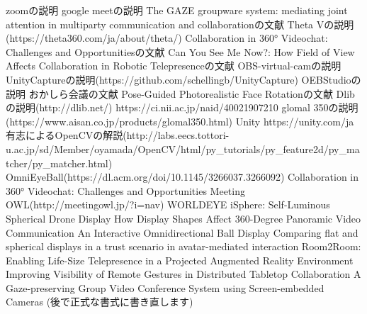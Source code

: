 
zoomの説明
google meetの説明
The GAZE groupware system: mediating joint attention in multiparty communication and collaborationの文献
Theta Vの説明(https://theta360.com/ja/about/theta/)
Collaboration in 360° Videochat: Challenges and Opportunitiesの文献
Can You See Me Now?: How Field of View Affects Collaboration in Robotic Telepresenceの文献
OBS-virtual-camの説明
UnityCaptureの説明(https://github.com/schellingb/UnityCapture)
OEBStudioの説明
おかしら会議の文献
Pose-Guided Photorealistic Face Rotationの文献
Dlibの説明(http://dlib.net/)
https://ci.nii.ac.jp/naid/40021907210
glomal 350の説明(https://www.aisan.co.jp/products/glomal350.html)
Unity https://unity.com/ja
有志によるOpenCVの解説(http://labs.eecs.tottori-u.ac.jp/sd/Member/oyamada/OpenCV/html/py\_tutorials/py\_feature2d/py\_matcher/py\_matcher.html)
OmniEyeBall(https://dl.acm.org/doi/10.1145/3266037.3266092)
Collaboration in 360° Videochat: Challenges and Opportunities
Meeting OWL(http://meetingowl.jp/?i=nav)
WORLDEYE
iSphere: Self-Luminous Spherical Drone Display
How Display Shapes Affect 360-Degree Panoramic Video Communication
An Interactive Omnidirectional Ball Display
Comparing flat and spherical displays in a trust scenario in avatar-mediated interaction
Room2Room: Enabling Life-Size Telepresence in a Projected Augmented Reality Environment
Improving Visibility of Remote Gestures in Distributed Tabletop Collaboration
A Gaze-preserving Group Video Conference System using Screen-embedded Cameras
(後で正式な書式に書き直します)
